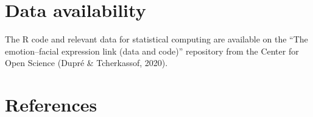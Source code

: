 \documentclass[
  english,
  man]{apa7}
\begin{document}
\hypertarget{data-availability}{%
\section{Data availability}\label{data-availability}}

The R code and relevant data for statistical computing are available on the ``The emotion--facial expression link (data and code)'' repository from the Center for Open Science (Dupré \& Tcherkassof, 2020).

\newpage

\hypertarget{references}{%
\section{References}\label{references}}

\begingroup
\setlength{\parindent}{-0.5in}
\setlength{\leftskip}{0.5in}
\end{document}
